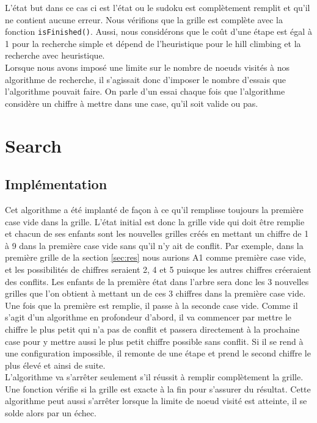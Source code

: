 \documentclass[a4paper,10pt]{article}
\begin{document}
L'état but dans ce cas ci est l'état ou le sudoku est complètement remplit et qu'il ne contient aucune erreur. Nous vérifions que la grille est complète avec la fonction \verb|isFinished()|. Aussi, nous considérons que le coût d'une étape est égal à 1 pour la recherche simple et dépend de l'heuristique pour le hill climbing et la recherche avec heuristique.\\

Lorsque nous avons imposé une limite sur le nombre de noeuds visités à nos algorithme de recherche, il s'agissait donc d'imposer le nombre d'essais que l'algorithme pouvait faire. On parle d'un essai chaque fois que l'algorithme considère un chiffre à mettre dans une case, qu'il soit valide ou pas. 

\section{Search}
\subsection{Implémentation}
Cet algorithme a été implanté de façon à ce qu'il remplisse toujours la première case vide dans la grille. L'état initial est donc la grille vide qui doit être remplie et chacun de ses enfants sont les nouvelles grilles créés en mettant un chiffre de 1 à 9 dans la première case vide sans qu'il n'y ait de conflit. Par exemple, dans la première grille de la section \ref{sec:res} nous aurions A1 comme première case vide, et les possibilités de chiffres seraient 2, 4 et 5 puisque les autres chiffres créeraient des conflits. Les enfants de la première état dans l'arbre sera donc les 3 nouvelles grilles que l'on obtient à mettant un de ces 3 chiffres dans la première case vide. \\

Une fois que la première est remplie, il passe à la seconde case vide. Comme il s'agit d'un algorithme en profondeur d'abord, il va commencer par mettre le chiffre le plus petit qui n'a pas de conflit et passera directement à la prochaine case pour y mettre aussi le plus petit chiffre possible sans conflit. Si il se rend à une configuration impossible, il remonte de une étape et prend le second chiffre le plus élevé et ainsi de suite.\\

L'algorithme va s'arrêter seulement s'il réussit à remplir complètement la grille. Une fonction vérifie si la grille est exacte à la fin pour s'assurer du résultat. Cette algorithme peut aussi s'arrêter lorsque la limite de noeud visité est atteinte, il se solde alors par un échec.
\end{document}
